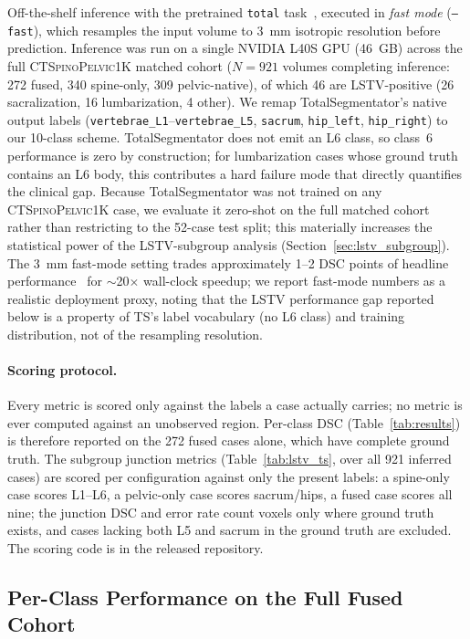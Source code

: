 \documentclass[pmlr]{jmlr}
\newcommand{\dataset}{\textsc{CTSpinoPelvic1K}}
\begin{document}
Off-the-shelf inference with the pretrained \texttt{total}
task~\citep{Wasserthal2023TotalSegmentator:Images}, executed in
\emph{fast mode} (\texttt{--fast}), which resamples the input
volume to 3~mm isotropic resolution before prediction.
Inference was run on a single NVIDIA L40S GPU (46~GB) across the
full \dataset{} matched cohort ($N=921$ volumes completing
inference: 272 fused, 340 spine-only, 309 pelvic-native), of which
46 are LSTV-positive (26 sacralization, 16 lumbarization, 4 other).
We remap TotalSegmentator's native output labels
(\texttt{vertebrae\_L1}--\texttt{vertebrae\_L5}, \texttt{sacrum},
\texttt{hip\_left}, \texttt{hip\_right}) to our 10-class scheme.
TotalSegmentator does not emit an L6 class, so class~6 performance
is zero by construction; for lumbarization cases whose ground
truth contains an L6 body, this contributes a hard failure mode
that directly quantifies the clinical gap.
Because TotalSegmentator was not trained on any \dataset{} case,
we evaluate it zero-shot on the full matched cohort rather than
restricting to the 52-case test split; this materially increases
the statistical power of the LSTV-subgroup analysis
(Section~\ref{sec:lstv_subgroup}).
The 3~mm fast-mode setting trades approximately 1--2 DSC points of
headline performance~\citep{Wasserthal2023TotalSegmentator:Images} for
$\sim$20$\times$ wall-clock speedup; we report fast-mode numbers as
a realistic deployment proxy, noting that the LSTV performance
gap reported below is a property of TS's label vocabulary
(no L6 class) and training distribution, not of the resampling
resolution.

\paragraph{Scoring protocol.}
Every metric is scored only against the labels a case actually
carries; no metric is ever computed against an unobserved region.
Per-class DSC (Table~\ref{tab:results}) is therefore reported on the
272 fused cases alone, which have complete ground truth. The
subgroup junction metrics (Table~\ref{tab:lstv_ts}, over all 921
inferred cases) are scored per configuration against only the
present labels: a spine-only case scores L1--L6, a pelvic-only case
scores sacrum/hips, a fused case scores all nine; the junction DSC
and error rate count voxels only where ground truth exists, and
cases lacking both L5 and sacrum in the ground truth are excluded.
The scoring code is in the released repository.

\subsection{Per-Class Performance on the Full Fused Cohort}
\end{document}

